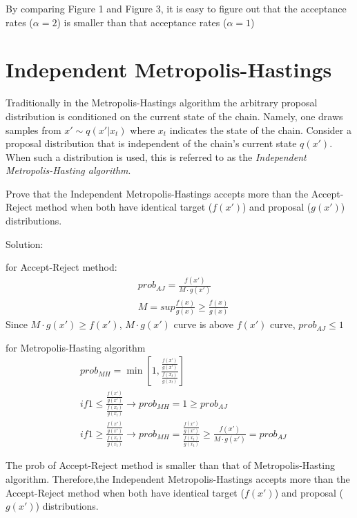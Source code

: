 \documentclass{article}
\begin{document}
By comparing Figure 1 and Figure 3, it is easy to figure out that the acceptance rates ($\alpha =2$) is smaller than that acceptance rates ($\alpha =1$)

\newpage
\section{Independent Metropolis-Hastings}
Traditionally in the Metropolis-Hastings algorithm the arbitrary proposal distribution is conditioned on the current state of the chain. Namely, one draws samples from $x' \sim q(x'|x_{t})$ where $x_t$ indicates the state of the chain. Consider a proposal distribution that is independent of the chain's current state $q(x')$. When such a distribution is used, this is referred to as the \textit{Independent Metropolis-Hasting algorithm}.

Prove that the Independent Metropolis-Hastings accepts more than the Accept-Reject method when both have identical target ($f(x')$) and proposal ($g(x')$) distributions.

Solution:

for Accept-Reject method:
\begin{equation}
\begin{aligned}
    & prob_{AJ} = \frac{f(x')}{M \cdot g(x')} \\
    & M = sup \frac{f(x)}{g(x)} \geq \frac{f(x)}{g(x)} 
\end{aligned}
\end{equation}
Since $M \cdot g(x') \geq f(x')$, $M \cdot g(x')$ curve is above $f(x')$ curve, $prob_{AJ} \leq 1$

for Metropolis-Hasting algorithm
\begin{equation}
\begin{aligned}
     & prob_{MH} = \min [1,\frac{\frac{f(x')}{g(x')}}{\frac{f(x_t)}{g(x_t)}}]  \\ %
    & if  1 \leq \frac{\frac{f(x')}{g(x')}}{\frac{f(x_t)}{g(x_t)}} \to prob_{MH}=1 \geq prob_{AJ} \\
    & if  1 \geq \frac{\frac{f(x')}{g(x')}}{\frac{f(x_t)}{g(x_t)}} \to prob_{MH}=\frac{\frac{f(x')}{g(x')}}{\frac{f(x_t)}{g(x_t)}} \geq \frac{f(x')}{M \cdot g(x')} = prob_{AJ}
\end{aligned}
\end{equation}

The prob of Accept-Reject method is smaller than that of Metropolis-Hasting algorithm.
Therefore,the Independent Metropolis-Hastings accepts more than the Accept-Reject method when both have identical target ($f(x')$) and proposal ($g(x')$) distributions.
\end{document}
